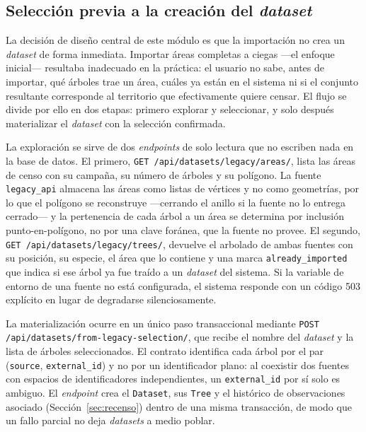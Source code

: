 \subsection{Selección previa a la creación del \textit{dataset}}

La decisión de diseño central de este módulo es que la importación no crea
un \textit{dataset} de forma inmediata. Importar áreas completas a ciegas ---el
enfoque inicial--- resultaba inadecuado en la práctica: el usuario no sabe, antes de
importar, qué árboles trae un área, cuáles ya están en el sistema ni si el conjunto
resultante corresponde al territorio que efectivamente quiere censar. El flujo se
divide por ello en dos etapas: primero explorar y seleccionar, y solo después
materializar el \textit{dataset} con la selección confirmada.

La exploración se sirve de dos \textit{endpoints} de solo lectura que no escriben
nada en la base de datos. El primero,
\texttt{GET /api/datasets/legacy/areas/}, lista las áreas de censo con su campaña, su
número de árboles y su polígono. La fuente \texttt{legacy\_api} almacena las áreas
como listas de vértices y no como geometrías, por lo que el polígono se reconstruye
---cerrando el anillo si la fuente no lo entrega cerrado--- y la pertenencia de cada
árbol a un área se determina por inclusión punto-en-polígono, no por una clave
foránea, que la fuente no provee. El segundo,
\texttt{GET /api/datasets/legacy/trees/}, devuelve el arbolado de ambas fuentes con
su posición, su especie, el área que lo contiene y una marca
\texttt{already\_imported} que indica si ese árbol ya fue traído a un \textit{dataset}
del sistema. Si la variable de entorno de una fuente no está configurada, el sistema
responde con un código 503 explícito en lugar de degradarse silenciosamente.

\begin{sloppypar}
La materialización ocurre en un único paso transaccional mediante
\texttt{POST /api/datasets/from-legacy-selection/}, que recibe el nombre del
\textit{dataset} y la lista de árboles seleccionados. El contrato
identifica cada árbol por el par (\texttt{source}, \texttt{external\_id}) y no por un
identificador plano: al coexistir dos fuentes con espacios de identificadores
independientes, un \texttt{external\_id} por sí solo es ambiguo. El
\textit{endpoint} crea el \texttt{Dataset}, sus \texttt{Tree} y el histórico de
observaciones asociado (Sección~\ref{sec:recenso}) dentro de una misma transacción,
de modo que un fallo parcial no deja \textit{datasets} a medio poblar.
\end{sloppypar}

